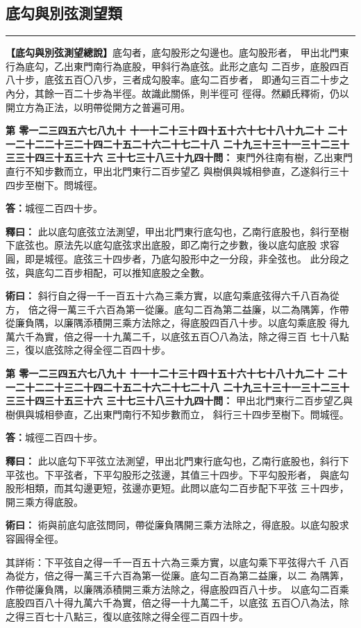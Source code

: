 \documentclass[11pt,a4paper]{article}
\newcommand{\longline}{\noindent\rule{\textwidth}{0.4pt}}
\newcounter{probnum}
\newcommand{\chnum}[1]{%
  \ifcase#1 零\or 一\or 二\or 三\or 四\or 五\or 六\or 七\or 八\or 九\or 十\or
    十一\or 十二\or 十三\or 十四\or 十五\or 十六\or 十七\or 十八\or 十九\or 二十\or
    二十一\or 二十二\or 二十三\or 二十四\or 二十五\or 二十六\or 二十七\or 二十八\or
    二十九\or 三十\or 三十一\or 三十二\or 三十三\or 三十四\or 三十五\or 三十六\or
    三十七\or 三十八\or 三十九\or 四十\fi}
\newcommand{\problem}[1]{\stepcounter{probnum}\par\noindent\textbf{第\chnum{\value{probnum}}問：}#1\par}
\newcommand{\answer}[1]{\par\noindent\textbf{答：}#1\par}
\newcommand{\shiyi}[1]{\par\noindent\textbf{釋曰：}#1\par}
\newcommand{\shuyue}[1]{\par\noindent\textbf{術曰：}#1\par}
\begin{document}
\newpage
\setcounter{probnum}{0}

\subsection*{底勾與別弦測望類}
\vspace{0.3cm}
\longline
\vspace{0.3cm}

\noindent
\textbf{【底勾與別弦測望總說】}底勾者，底勾股形之勾邊也。底勾股形者，
甲出北門東行為底勾，乙出東門南行為底股，甲斜行為底弦。此形之底勾
二百步，底股四百八十步，底弦五百〇八步，三者成勾股率。底勾二百步者，
即通勾三百二十步之內分，其餘一百二十步為半徑。故識此關係，則半徑可
徑得。然顧氏釋術，仍以開立方為正法，以明帶從開方之普遍可用。

\problem{
東門外往南有樹，乙出東門直行不知步數而立，甲出北門東行二百步望乙
與樹俱與城相參直，乙遂斜行三十四步至樹下。問城徑。
}

\answer{城徑二百四十步。}

\shiyi{
此以底勾底弦立法測望，甲出北門東行底勾也，乙南行底股也，斜行至樹
下底弦也。原法先以底勾底弦求出底股，即乙南行之步數，後以底勾底股
求容圓，即是城徑。底弦三十四步者，乃底勾股形中之一分段，非全弦也。
此分段之弦，與底勾二百步相配，可以推知底股之全數。
}

\shuyue{
斜行自之得一千一百五十六為三乘方實，以底勾乘底弦得六千八百為從方，
倍之得一萬三千六百為第一從廉。底勾二百為第二益廉，以二為隅筭，作帶
從廉負隅，以廉隅添積開三乘方法除之，得底股四百八十步。以底勾乘底股
得九萬六千為實，倍之得一十九萬二千，以底弦五百〇八為法，除之得三百
七十八點三，復以底弦除之得全徑二百四十步。
}

\vspace{0.3cm}
\problem{
甲出北門東行二百步望乙與樹俱與城相參直，乙出東門南行不知步數而立，
斜行三十四步至樹下。問城徑。
}

\answer{城徑二百四十步。}

\shiyi{
此以底勾下平弦立法測望，甲出北門東行底勾也，乙南行底股也，斜行下
平弦也。下平弦者，下平勾股形之弦邊，其值三十四步。下平勾股形者，
與底勾股形相類，而其勾邊更短，弦邊亦更短。此問以底勾二百步配下平弦
三十四步，開三乘方得底股。
}

\shuyue{
術與前底勾底弦問同，帶從廉負隅開三乘方法除之，得底股。以底勾股求
容圓得全徑。

其詳術：下平弦自之得一千一百五十六為三乘方實，以底勾乘下平弦得六千
八百為從方，倍之得一萬三千六百為第一從廉。底勾二百為第二益廉，以二
為隅筭，作帶從廉負隅，以廉隅添積開三乘方法除之，得底股四百八十步。
以底勾二百乘底股四百八十得九萬六千為實，倍之得一十九萬二千，以底弦
五百〇八為法，除之得三百七十八點三，復以底弦除之得全徑二百四十步。
}
\end{document}

